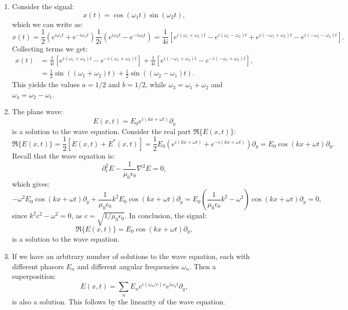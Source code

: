 \begin{enumerate}
  \item Consider the signal:
        \[ x(t) = \cos(\omega_{1}t)\sin(\omega_{2}t), \]
        which we can write as:
        \[ x(t) = \frac{1}{2}(e^{i\omega_{1}t}+e^{-i\omega_{1} t})\frac{1}{2i}(e^{i\omega_{2}t}-e^{-i\omega_{2}t})=\frac{1}{4i}[e^{i(\omega_{1}+\omega_{2})t}-e^{i(\omega_{1}-\omega_{2})t}+e^{i(-\omega_{1}+\omega_{2})t}-e^{i(-\omega_{1}-\omega_{2})t}]. \]
        Collecting terms we get:
        \begin{align*}
          x(t) & =\frac{1}{4i}[e^{i(\omega_{1}+\omega_{2})t}-e^{-i(\omega_{1}+\omega_{2})t}]+\frac{1}{4i}[e^{i(-\omega_{1}+\omega_{2})t}-e^{-i(-\omega_{1}+\omega_{2})t}], \\
               & =\frac{1}{2}\sin((\omega_{1}+\omega_{2})t)+\frac{1}{2}\sin((\omega_{2}-\omega_{1})t).
        \end{align*}
        This yields the values $a=1/2$ and $b=1/2$, while $\omega_{3}=\omega_{1}+\omega_{2}$ and $\omega_{4}=\omega_{2}-\omega_{1}$.

  \item The plane wave:
        \[ E(x,t) = E_{0}e^{i(kx+\omega t)}\partial_{y} \]
        is a solution to the wave equation. Consider the real part $\Re\{E(x,t)\}$:
        \[ \Re\{E(x,t)\} = \frac{1}{2}[E(x,t)+E^{*}(x,t)]=\frac{1}{2}E_{0}(e^{i(kx+\omega t)}+e^{-i(kx+\omega t)})\partial_{y}=E_{0}\cos(kx+\omega t)\partial_{y}. \]
        Recall that the wave equation is:
        \[ \partial_{t}^{2}E-\frac{1}{\mu_{0}\epsilon_{0}}\nabla^{2}E=0, \]
        which gives:
        \[ -\omega^{2}E_{0}\cos(kx+\omega t)\partial_{y}+\frac{1}{\mu_{0}\epsilon_{0}}k^{2}E_{0}\cos(kx+\omega t)\partial_{y}=E_{0}\left(\frac{1}{\mu_{0}\epsilon_{0}}k^{2}-\omega^{2}\right)\cos(kx+\omega t)\partial_{y}=0, \]
        since $k^{2}c^{2}-\omega^{2}=0$, as $c=\sqrt{1/\mu_0\epsilon_0}$. In conclusion, the signal:
        \[ \Re\{E(x,t)\} = E_{0}\cos(kx+\omega t)\partial_{y}, \]
        is a solution to the wave equation.

  \item If we have an arbitrary number of solutions to the wave equation, each with different
        phasors $E_{n}$ and different angular frequencies $\omega_{n}$. Then a superposition:
        \[ E(x,t) = \sum_{n}E_{n}e^{i(\omega_{n}/c)x}e^{i\omega_{n}t}\partial_{y}, \]
        is also a solution. This follows by the linearity of the wave equation.


\end{enumerate}
